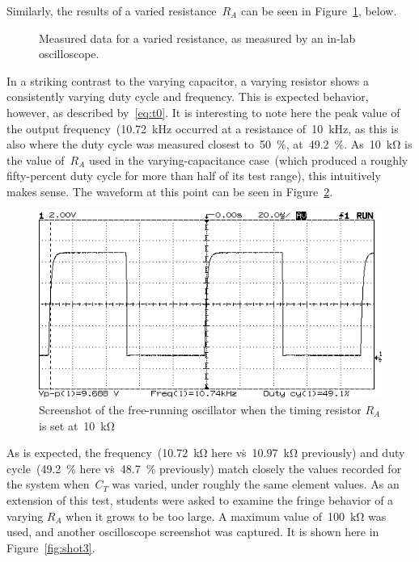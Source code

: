 Similarly, the results of a varied resistance~$R_A$ can be seen in
Figure~\ref{fig:free_run_r}, below.
%
\begin{figure}[H]
	\centering
	
	\parbox{.6\textwidth}{
	\caption[Free Running Oscillator --- Varying $R_A$]{Measured data for a
	varied resistance, as measured by an in-lab oscilloscope.}
	\label{fig:free_run_r}}
\end{figure}
%
In a striking contrast to the varying capacitor, a varying resistor shows a
consistently varying duty cycle and frequency.  This is expected behavior,
however, as described by~\eqref{eq:t0}.  It is interesting to note here the
peak value of the output frequency~(\SI{10.72}{\kilo\hertz} occurred at a
resistance of~\SI{10}{\kilo\hertz}, as this is also where the duty cycle was
measured closest to~\SI{50}{\percent}, at~\SI{49.2}{\percent}.
As~\SI{10}{\kilo\ohm} is the value of~$R_A$ used in the varying-capacitance
case~(which produced a roughly fifty-percent duty cycle for more than half of
its test range), this intuitively makes sense.  The waveform at this point can
be seen in Figure~\ref{fig:shot4}.
%
\begin{figure}[H]
	\centering
	\includegraphics[width=.6\textwidth]{img/shot/shot4.png}
	\parbox{.6\textwidth}{
	\caption[Free Running Oscillator --- Varying $R_A$ at \SI{49.2}{\percent}
	Duty Cycle]{Screenshot of the free-running oscillator when the timing
	resistor $R_A$ is set at~\SI{10}{\kilo\ohm}}
	\label{fig:shot4}}
\end{figure}
%
As is expected, the frequency~(\SI{10.72}{\kilo\ohm} here
vs\.~\SI{10.97}{\kilo\ohm} previously) and duty cycle~(\SI{49.2}{\percent} here
vs\.~\SI{48.7}{\percent} previously) match closely the values recorded for the
system when~$C_T$ was varied, under roughly the same element values.  As an
extension of this test, students were asked to examine the fringe behavior of a
varying $R_A$ when it grows to be too large.  A maximum value
of~\SI{100}{\kilo\ohm} was used, and another oscilloscope screenshot was
captured.  It is shown here in Figure~\ref{fig:shot3}.
%

